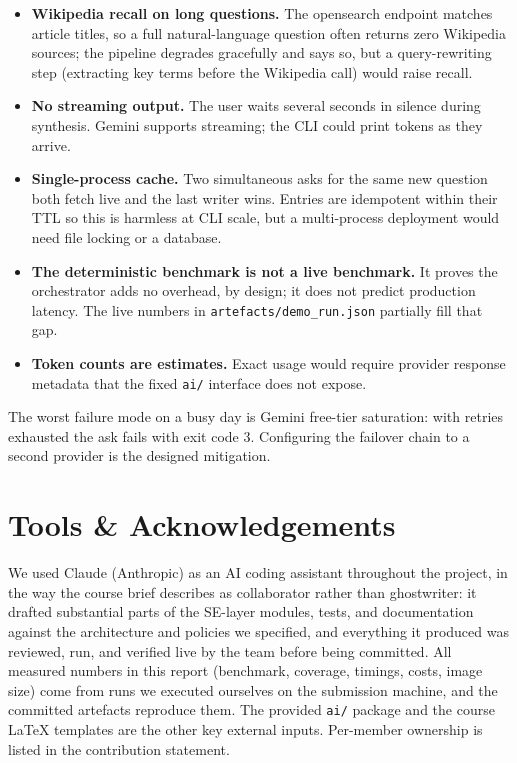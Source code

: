 \documentclass[11pt,a4paper]{article}
\begin{document}
\begin{itemize}[topsep=2pt,itemsep=1pt]
  \item \textbf{Wikipedia recall on long questions.} The opensearch endpoint matches article titles, so a full natural-language question often returns zero Wikipedia sources; the pipeline degrades gracefully and says so, but a query-rewriting step (extracting key terms before the Wikipedia call) would raise recall.
  \item \textbf{No streaming output.} The user waits several seconds in silence during synthesis. Gemini supports streaming; the CLI could print tokens as they arrive.
  \item \textbf{Single-process cache.} Two simultaneous asks for the same new question both fetch live and the last writer wins. Entries are idempotent within their TTL so this is harmless at CLI scale, but a multi-process deployment would need file locking or a database.
  \item \textbf{The deterministic benchmark is not a live benchmark.} It proves the orchestrator adds no overhead, by design; it does not predict production latency. The live numbers in \texttt{artefacts/demo\_run.json} partially fill that gap.
  \item \textbf{Token counts are estimates.} Exact usage would require provider response metadata that the fixed \texttt{ai/} interface does not expose.
\end{itemize}

The worst failure mode on a busy day is Gemini free-tier saturation: with retries exhausted the ask fails with exit code 3. Configuring the failover chain to a second provider is the designed mitigation.

\section{Tools \& Acknowledgements}\label{sec:tools}

We used Claude (Anthropic) as an AI coding assistant throughout the project, in the way the course brief describes as collaborator rather than ghostwriter: it drafted substantial parts of the SE-layer modules, tests, and documentation against the architecture and policies we specified, and everything it produced was reviewed, run, and verified live by the team before being committed. All measured numbers in this report (benchmark, coverage, timings, costs, image size) come from runs we executed ourselves on the submission machine, and the committed artefacts reproduce them. The provided \texttt{ai/} package and the course LaTeX templates are the other key external inputs. Per-member ownership is listed in the contribution statement.
\end{document}
